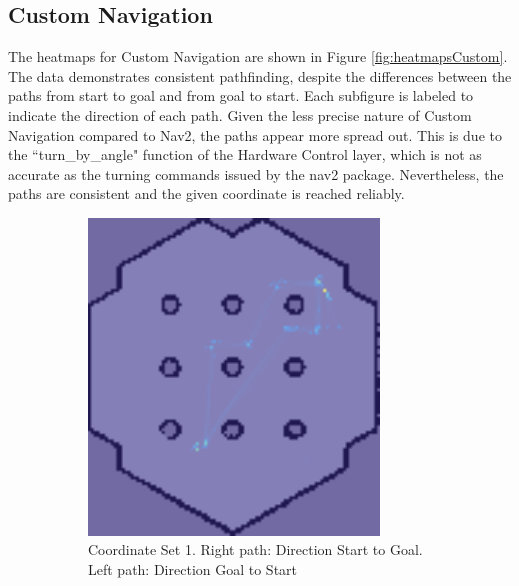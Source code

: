 \documentclass[%
paper=A4,               %
twoside=true,           %
openright,              %
11pt,                   %
bibliography=totoc,     %
titlepage=on,           %
DIV=12,                 %
BCOR=1.5cm,             %
parskip=half,            %
final
]{scrreprt}
\begin{document}
	\subsection{Custom Navigation}
	 The heatmaps for Custom Navigation are shown in Figure \ref{fig:heatmapsCustom}. The data demonstrates consistent pathfinding, despite the differences between the paths from start to goal and from goal to start. Each subfigure is labeled to indicate the direction of each path. Given the less precise nature of Custom Navigation compared to Nav2, the paths appear more spread out. This is due to the ``turn\_by\_angle" function of the Hardware Control layer, which is not as accurate as the turning commands issued by the nav2 package. Nevertheless, the paths are consistent and the given coordinate is reached reliably.
	\begin{figure}[H]
		\centering
		\begin{subfigure}[b]{0.45\textwidth}
			\centering
			\includegraphics[width=0.85\textwidth]{Graphics/heatmapCustomSet1.png}
			\caption{Coordinate Set 1. Right path: Direction Start to Goal. Left path: Direction Goal to Start}
			\label{fig:fig17}
		\end{subfigure}
		\hfill
		\begin{subfigure}[b]{0.45\textwidth}
			\centering

\end{subfigure}
\end{figure}
\end{document}
